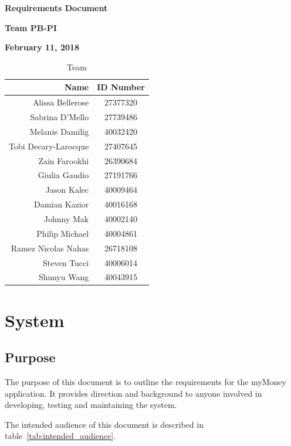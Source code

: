 \documentclass[12pt]{article}
\begin{document}
\vspace*{0.5in}
\centerline{\bf\Large Requirements Document}

\vspace*{0.5in}
\centerline{\bf\Large Team PB-PI}

\vspace*{0.5in}
\centerline{\bf\Large February 11, 2018}

\vspace*{1.5in}
\begin{table}[htbp]
\caption{Team}
\begin{center}
\begin{tabular}{|r | c|}
\hline
Name & ID Number \\
\hline\hline
Alissa Bellerose & 27377320 \\
Sabrina D'Mello & 27739486 \\
Melanie Damilig & 40032420 \\
Tobi Decary-Larocque & 27407645 \\
Zain Farookhi & 26390684 \\
Giulia Gaudio & 27191766 \\
Jason Kalec & 40009464 \\
Damian Kazior & 40016168 \\
Johnny Mak & 40002140 \\
Philip Michael & 40004861 \\
Ramez Nicolas Nahas & 26718108 \\
Steven Tucci & 40006014 \\
Shunyu Wang & 40043915 \\
\hline
\end{tabular}
\end{center}
\end{table}

\clearpage

\section{System}

\subsection{Purpose}
The purpose of this document is to outline the requirements for the myMoney application. It provides direction and background to anyone involved in developing, testing and maintaining the system.

The intended audience of this document is described in table~\ref{tab:intended_audience}.
\end{document}
